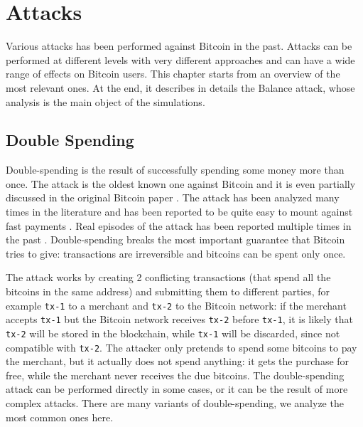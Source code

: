 \chapter{Attacks}
\label{chapter:attacks}
Various attacks has been performed against Bitcoin in the past.
Attacks can be performed at different levels with very different approaches and can have a wide range of effects on Bitcoin users.
This chapter starts from an overview of the most relevant ones.
At the end, it describes in details the Balance attack, whose analysis is the main object of the simulations.

\section{Double Spending}
\label{sec:double-spending}
Double-spending is the result of successfully spending some money more than once.
The attack is the oldest known one against Bitcoin and it is even partially discussed in the original Bitcoin paper \cite{bitcoin_2009}.
The attack has been analyzed many times in the literature \cite{double_spending_fast_payments, double_spending_two_for_one, double_spending_bitcoin_economics, double_spending_fast_analysis_2014} and has been reported to be quite easy to mount against fast payments \cite{double_spending_fast_payments}.
Real episodes of the attack has been reported multiple times in the past \cite{double_spending_ghash, double_spending_stackexchange}.
Double-spending breaks the most important guarantee that Bitcoin tries to give:
transactions are irreversible and bitcoins can be spent only once.

The attack works by creating \num{2} conflicting transactions (that spend all the bitcoins in the same address) and submitting them to different parties, for example \texttt{tx-1} to a merchant and \texttt{tx-2} to the Bitcoin network:
if the merchant accepts \texttt{tx-1} but the Bitcoin network receives \texttt{tx-2} before \texttt{tx-1}, it is likely that \texttt{tx-2} will be stored in the blockchain, while \texttt{tx-1} will be discarded, since not compatible with \texttt{tx-2}.
The attacker only pretends to spend some bitcoins to pay the merchant, but it actually does not spend anything:
it gets the purchase for free, while the merchant never receives the due bitcoins.
The double-spending attack can be performed directly in some cases, or it can be the result of more complex attacks.
There are many variants of double-spending, we analyze the most common ones here.


